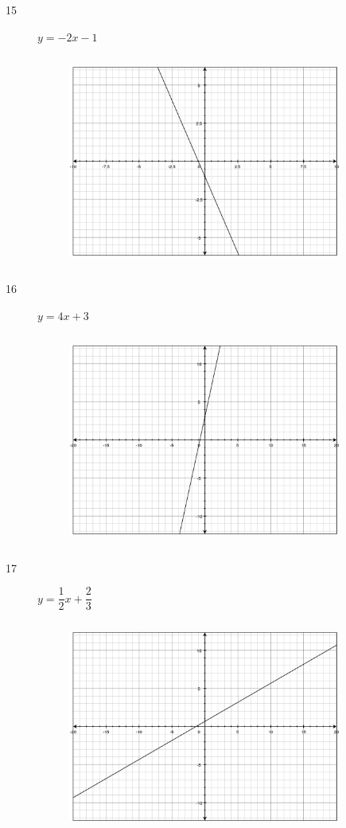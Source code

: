 \documentclass[fleqn,addpoints]{exam}
\begin{document}
\begin{description}

\item[15]
$y=-2x-1$
\begin{figure}[H]
  \includegraphics[width=9cm,height=7cm]{p356/15}
\end{figure}

\pagebreak

\item[16]
$y=4x+3$
\begin{figure}[H]
  \includegraphics[width=9cm,height=7cm]{p356/16}
\end{figure}

\item[17]
$y=\dfrac{1}{2} x + \dfrac{2}{3}$
\begin{figure}[H]
  \includegraphics[width=9cm,height=7cm]{p356/17}
\end{figure}


\end{description}
\end{document}
